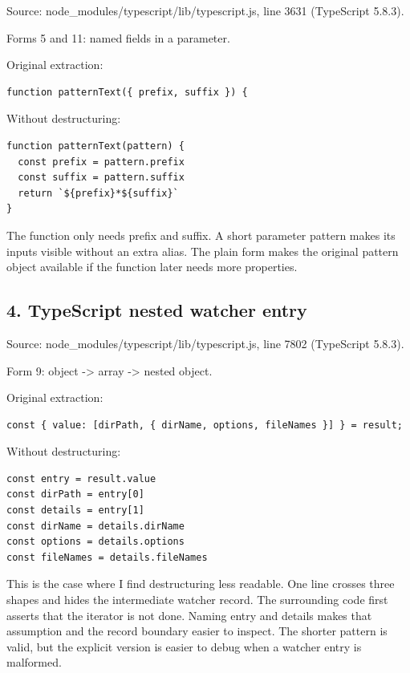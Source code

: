 \documentclass[
  10pt,
  a4paper,
]{article}
\begin{document}
Source: node\_modules/typescript/lib/typescript.js, line 3631
(TypeScript 5.8.3).

Forms 5 and 11: named fields in a parameter.

Original extraction:

\begin{lstlisting}
function patternText({ prefix, suffix }) {
\end{lstlisting}

Without destructuring:

\begin{lstlisting}
function patternText(pattern) {
  const prefix = pattern.prefix
  const suffix = pattern.suffix
  return `${prefix}*${suffix}`
}
\end{lstlisting}

The function only needs prefix and suffix. A short parameter pattern
makes its inputs visible without an extra alias. The plain form makes
the original pattern object available if the function later needs more
properties.

\subsection{4. TypeScript nested watcher
entry}\label{4-typescript-nested-watcher-entry}

Source: node\_modules/typescript/lib/typescript.js, line 7802
(TypeScript 5.8.3).

Form 9: object -\textgreater{} array -\textgreater{} nested object.

Original extraction:

\begin{lstlisting}
const { value: [dirPath, { dirName, options, fileNames }] } = result;
\end{lstlisting}

Without destructuring:

\begin{lstlisting}
const entry = result.value
const dirPath = entry[0]
const details = entry[1]
const dirName = details.dirName
const options = details.options
const fileNames = details.fileNames
\end{lstlisting}

This is the case where I find destructuring less readable. One line
crosses three shapes and hides the intermediate watcher record. The
surrounding code first asserts that the iterator is not done. Naming
entry and details makes that assumption and the record boundary easier
to inspect. The shorter pattern is valid, but the explicit version is
easier to debug when a watcher entry is malformed.
\end{document}
